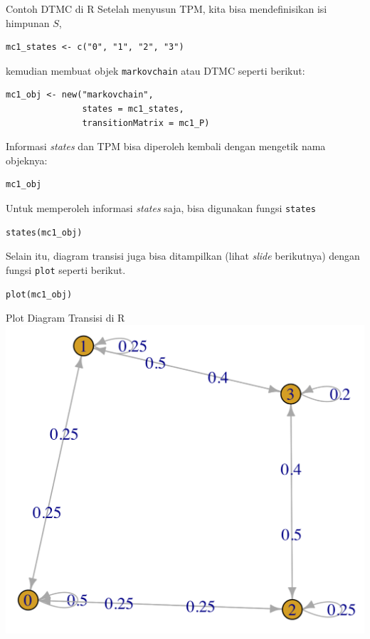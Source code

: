 \documentclass{beamer}
\begin{document}
\begin{frame}[fragile]{Contoh DTMC di R}
    Setelah menyusun TPM, kita bisa mendefinisikan isi himpunan \(S\),

\begin{verbatim}
mc1_states <- c("0", "1", "2", "3")
\end{verbatim}
    kemudian membuat objek \verb|markovchain| atau DTMC seperti berikut:

\begin{verbatim}
mc1_obj <- new("markovchain",
               states = mc1_states,
               transitionMatrix = mc1_P)    
\end{verbatim}

    Informasi \textit{states} dan TPM bisa diperoleh kembali dengan mengetik nama objeknya:

\begin{verbatim}
mc1_obj
\end{verbatim}

    Untuk memperoleh informasi \textit{states} saja, bisa digunakan fungsi \verb|states|

\begin{verbatim}
states(mc1_obj)
\end{verbatim}

    Selain itu, diagram transisi juga bisa ditampilkan (lihat \textit{slide} berikutnya) dengan fungsi \verb|plot| seperti berikut.

\begin{verbatim}
plot(mc1_obj)
\end{verbatim}
\end{frame}

\begin{frame}{Plot Diagram Transisi di R}
    \includegraphics[scale=0.9]{gambar/contoh_dtmc_plot.png}
\end{frame}
\end{document}
